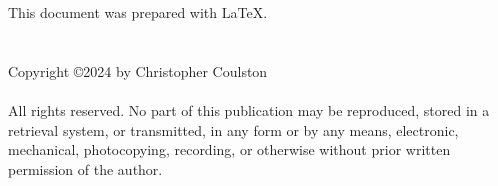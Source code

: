 This document was prepared with \LaTeX.
\\
\\
\\

Copyright \copyright  2024 by Christopher Coulston
\\
\\

All rights reserved.  No part of this publication may be reproduced, 
stored in a retrieval system, or transmitted, in any form or by any
means, electronic, mechanical, photocopying, recording, or otherwise
without prior written permission of the author.
